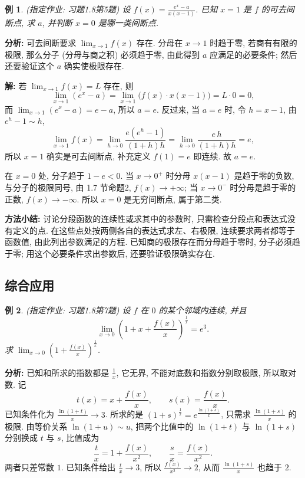 \documentclass[UTF8,openany]{ctexbook}
\theoremstyle{chinesetextbook}
\newtheorem{example}{例}[section]
\newenvironment{cnsolution}{\par\indent\textbf{解:} \ignorespaces}{\par}
\begin{document}
\begin{example}
\textnormal{(指定作业: 习题1.8第5题)} 设 $\displaystyle f(x)=\frac{e^x-a}{x(x-1)}$. 已知 $x=1$ 是 $f$ 的可去间断点, 求 $a$, 并判断 $x=0$ 是哪一类间断点.
\end{example}
\par\indent\textbf{分析:} 可去间断要求 $\displaystyle\lim_{x\to1}f(x)$ 存在. 分母在 $x\to1$ 时趋于零, 若商有有限的极限, 那么分子 (分母与商之积) 必须趋于零, 由此得到 $a$ 应满足的必要条件; 然后还要验证这个 $a$ 确实使极限存在.
\begin{cnsolution}
若 $\displaystyle\lim_{x\to1}f(x)=L$ 存在, 则
\[
\lim_{x\to1}(e^x-a)=\lim_{x\to1}\bigl(f(x)\cdot x(x-1)\bigr)=L\cdot0=0,
\]
而 $\displaystyle\lim_{x\to1}(e^x-a)=e-a$, 所以 $a=e$. 反过来, 当 $a=e$ 时, 令 $h=x-1$, 由 $e^h-1\sim h$,
\[
\lim_{x\to1}f(x)=\lim_{h\to0}\frac{e(e^h-1)}{(1+h)h}=\lim_{h\to0}\frac{e\,h}{(1+h)h}=e,
\]
所以 $x=1$ 确实是可去间断点, 补充定义 $f(1)=e$ 即连续. 故 $a=e$.

在 $x=0$ 处, 分子趋于 $1-e<0$. 当 $x\to0^+$ 时分母 $x(x-1)$ 是趋于零的负数, 与分子的极限同号, 由 1.7 节命题2, $f(x)\to+\infty$; 当 $x\to0^-$ 时分母是趋于零的正数, $f(x)\to-\infty$. 所以 $x=0$ 是无穷间断点, 属于第二类.
\end{cnsolution}
\par\indent\textbf{方法小结:} 讨论分段函数的连续性或求其中的参数时, 只需检查分段点和表达式没有定义的点. 在这些点处按两侧各自的表达式求左、右极限, 连续要求两者都等于函数值, 由此列出参数满足的方程. 已知商的极限存在而分母趋于零时, 分子必须趋于零; 用这个必要条件求出参数后, 还要验证极限确实存在.
\subsection{综合应用}
\begin{example}
\textnormal{(指定作业: 习题1.8第7题)} 设 $f$ 在 $0$ 的某个邻域内连续, 并且
\[
\lim_{x\to0}\left(1+x+\frac{f(x)}x\right)^{\frac1x}=e^3.
\]
求 $\displaystyle\lim_{x\to0}\left(1+\frac{f(x)}x\right)^{\frac1x}$.
\end{example}
\par\indent\textbf{分析:} 已知和所求的指数都是 $\displaystyle\frac1x$, 它无界, 不能对底数和指数分别取极限, 所以取对数. 记
\[
t(x)=x+\frac{f(x)}x,\qquad s(x)=\frac{f(x)}x.
\]
已知条件化为 $\displaystyle\frac{\ln(1+t)}x\to3$. 所求的是 $\displaystyle(1+s)^{\frac1x}=e^{\frac{\ln(1+s)}x}$, 只需求 $\displaystyle\frac{\ln(1+s)}x$ 的极限. 由等价关系 $\ln(1+u)\sim u$, 把两个比值中的 $\ln(1+t)$ 与 $\ln(1+s)$ 分别换成 $t$ 与 $s$, 比值成为
\[
\frac tx=1+\frac{f(x)}{x^2},\qquad\frac sx=\frac{f(x)}{x^2}.
\]
两者只差常数 $1$. 已知条件给出 $\displaystyle\frac tx\to3$, 所以 $\displaystyle\frac{f(x)}{x^2}\to2$, 从而 $\displaystyle\frac{\ln(1+s)}x$ 也趋于 $2$.
\end{document}

